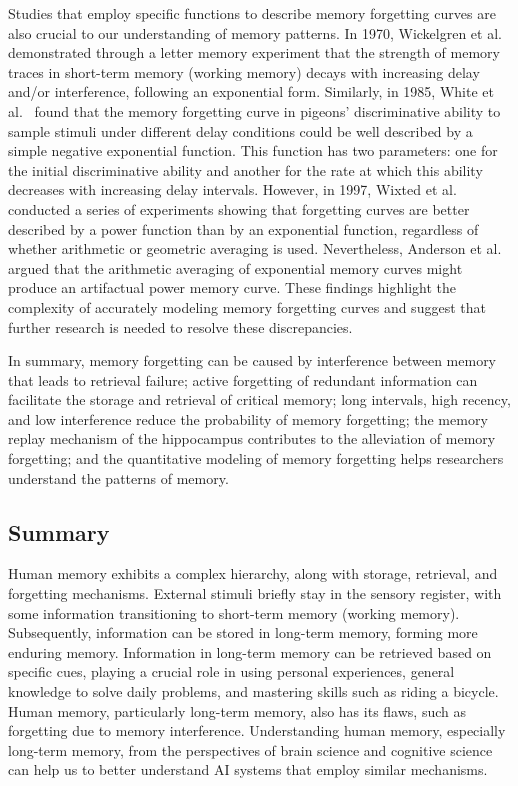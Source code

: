 \documentclass[journal,hideappendix]{vgtc}
\begin{document}
Studies that employ specific functions to describe memory forgetting curves are also crucial to our understanding of memory patterns. In 1970, Wickelgren et al.~\cite{wickelgren1970time} demonstrated through a letter memory experiment that the strength of memory traces in short-term memory (working memory) decays with increasing delay and/or interference, following an exponential form. Similarly, in 1985, White et al.~\cite{white1985characteristics} found that the memory forgetting curve in pigeons' discriminative ability to sample stimuli under different delay conditions could be well described by a simple negative exponential function. 
This function has two parameters: one for the initial discriminative ability and another for the rate at which this ability decreases with increasing delay intervals. However, in 1997, Wixted et al.~\cite{wixted1997genuine} conducted a series of experiments showing that forgetting curves are better described by a power function than by an exponential function, regardless of whether arithmetic or geometric averaging is used. Nevertheless, Anderson et al.~\cite{anderson1997memory} argued that the arithmetic averaging of exponential memory curves might produce an artifactual power memory curve. These findings highlight the complexity of accurately modeling memory forgetting curves and suggest that further research is needed to resolve these discrepancies.

In summary, memory forgetting can be caused by interference between memory that leads to retrieval failure; active forgetting of redundant information can facilitate the storage and retrieval of critical memory; long intervals, high recency, and low interference reduce the probability of memory forgetting; the memory replay mechanism of the hippocampus contributes to the alleviation of memory forgetting; and the quantitative modeling of memory forgetting helps researchers understand the patterns of memory.


\subsection{Summary}

Human memory exhibits a complex hierarchy, along with storage, retrieval, and forgetting mechanisms.
External stimuli briefly stay in the sensory register, with some information transitioning to short-term memory (working memory). Subsequently, information can be stored in long-term memory, forming more enduring memory. Information in long-term memory can be retrieved based on specific cues, playing a crucial role in using personal experiences, general knowledge to solve daily problems, and mastering skills such as riding a bicycle.
Human memory, particularly long-term memory, also has its flaws, such as forgetting due to memory interference.
Understanding human memory, especially long-term memory, from the perspectives of brain science and cognitive science can help us to better understand AI systems that employ similar mechanisms.
\end{document}
